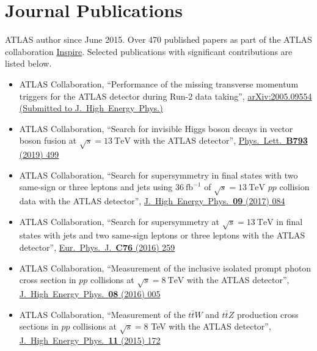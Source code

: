 \documentclass[a4paper,10pt]{article}
\begin{document}
\section{Journal Publications}
{ATLAS author since June 2015. Over 470 published papers as part of the ATLAS collaboration \href{https://inspirehep.net/authors/1307536}{Inspire}. Selected publications with significant contributions are listed below.}
\begin{itemize}
\item ATLAS Collaboration,
  ``Performance of the missing transverse momentum triggers for the ATLAS detector during Run-2 data taking'',
  \href{https://arxiv.org/pdf/2005.09554.pdf}{arXiv:2005.09554 (Submitted to J.\ High\ Energy\ Phys.)}
	\item ATLAS Collaboration,
	``Search for invisible Higgs boson decays in vector boson fusion at $\sqrt{s}=13\ \mathrm{TeV}$ with the ATLAS detector'',
	\href{https://www.sciencedirect.com/science/article/pii/S0370269319302564}{Phys.\ Lett.\ {\bf B793} (2019) 499}
	\item ATLAS Collaboration,
	``Search for supersymmetry in final states with two same-sign or three leptons and jets using $36\ \mathrm{fb}^{-1}$ of $\sqrt{s}=13\ \mathrm{TeV}$ $pp$ collision data with the ATLAS detector'',
	\href{https://link.springer.com/article/10.1007/JHEP09(2017)084}{J.\ High\ Energy\ Phys.\ {\bf 09} (2017) 084}
	\item ATLAS Collaboration,
	``Search for supersymmetry at $\sqrt{s}=13\ \mathrm{TeV}$ in final states with jets and two same-sign leptons or three leptons with the ATLAS detector'',
	\href{https://link.springer.com/article/10.1140/epjc/s10052-016-4095-8}{Eur.\ Phys.\ J.\ {\bf C76} (2016) 259}
	\item ATLAS Collaboration,
	``Measurement of the inclusive isolated prompt photon cross section in $pp$ collisions at $\sqrt{s}=8\ \mathrm{TeV}$ with the ATLAS detector'',
	\href{https://link.springer.com/article/10.1007/JHEP08(2016)005}{J.\ High\ Energy\ Phys.\ {\bf 08} (2016) 005 }
	\item ATLAS Collaboration,
	``Measurement of the $t\bar{t}W$ and $t\bar{t}Z$ production cross sections in $pp$ collisions at $\sqrt{s} = 8$ TeV with the ATLAS detector'',
	\href{https://link.springer.com/article/10.1007/JHEP11(2015)172}{J.\ High\ Energy\ Phys.\ {\bf 11} (2015) 172 }

\end{itemize}
\end{document}
